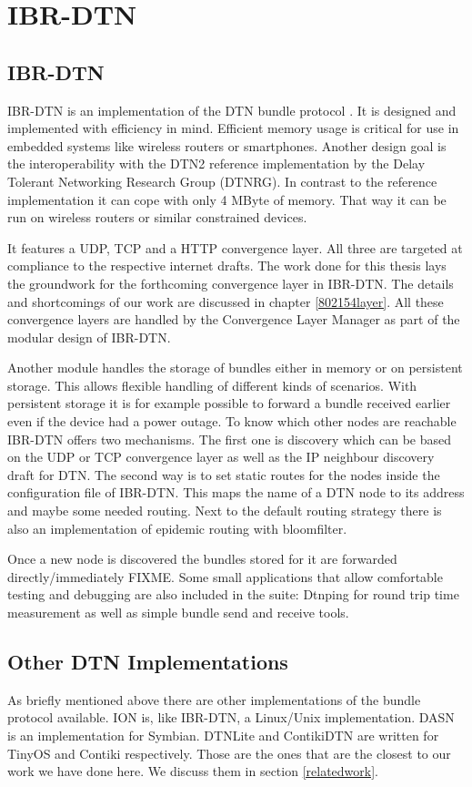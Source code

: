 \chapter{IBR-DTN}
\label{ibr-dtn}
\section{IBR-DTN}

IBR-DTN is an implementation of the DTN bundle protocol \cite{RFC5050}. It is
designed and implemented with efficiency in mind. Efficient memory usage is critical
for use in embedded systems like wireless routers or smartphones. Another design
goal is the interoperability with the DTN2 reference implementation by the Delay
Tolerant Networking Research Group (DTNRG). In contrast to the reference
implementation it can cope with only 4 MByte of memory. That way it can be run
on wireless routers or similar constrained devices.

It features a UDP, TCP and a HTTP convergence layer. All three are targeted at
compliance to the respective internet drafts. The work done for this thesis lays
the groundwork for the forthcoming convergence layer in IBR-DTN. The details and
shortcomings of our work are discussed in chapter \ref{802154layer}. All these
convergence layers are handled by the Convergence Layer Manager as part of the
modular design of IBR-DTN.

Another module handles the storage of bundles either in memory or on persistent
storage. This allows flexible handling of different kinds of scenarios. With
persistent storage it is for example possible to forward a bundle received earlier
even if the device had a power outage. To know which other nodes are reachable
IBR-DTN offers two mechanisms. The first one is discovery which can be based on
the UDP or TCP convergence layer as well as the IP neighbour discovery draft for
DTN. The second way is to set static routes for the nodes inside the
configuration file of IBR-DTN. This maps the name of a DTN node to its address
and maybe some needed routing. Next to the default routing strategy there is
also an implementation of epidemic routing with bloomfilter.

Once a new node is discovered the bundles stored for it are forwarded directly/immediately FIXME.
Some small applications that allow comfortable testing and debugging are also
included in the suite: Dtnping for round trip time measurement as well as simple bundle
send and receive tools.

\section{Other DTN Implementations}

As briefly mentioned above there are other implementations of the bundle
protocol available. ION is, like IBR-DTN, a Linux/Unix implementation. DASN is
an implementation for Symbian. DTNLite and ContikiDTN are written for TinyOS and
Contiki respectively. Those are the ones that are the closest to our work we
have done here. We discuss them in section \ref{relatedwork}.
